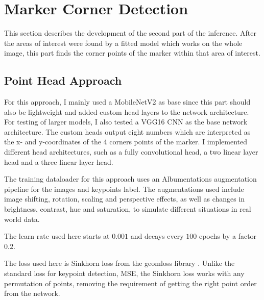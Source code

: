 \documentclass[10pt]{book}
\newcommand{\figureref}[1]{\autoref{#1}}
\begin{document}
\section{Marker Corner Detection}

This section describes the development of the second part of the inference. After the areas of interest were found by a fitted model which works on the whole image, this part finds the corner points of the marker within that area of interest.

\subsection{Point Head Approach}

For this approach, I mainly used a MobileNetV2 as base since this part should also be lightweight and added custom head layers to the network architecture. For testing of larger models, I also tested a VGG16 \ac{CNN} as the base network architecture. The custom heads output eight numbers which are interpreted as the x- and y-coordinates of the 4 corners points of the marker. I implemented different head architectures, such as a fully convolutional head, a two linear layer head and a three linear layer head.

The training dataloader for this approach uses an Albumentations augmentation pipeline for the images and keypoints label. The augmentations used include image shifting, rotation, scaling and perspective effects, as well as changes in brightness, contrast, hue and saturation, to simulate different situations in real world data.

The learn rate used here starts at $0.001$ and decays every $100$ epochs by a factor $0.2$. 


The loss used here is Sinkhorn loss from the geomloss library \cite{feydy2019interpolating}. Unlike the standard loss for keypoint detection, \ac{MSE}, the Sinkhorn loss works with any permutation of points, removing the requirement of getting the right point order from the network. 
\end{document}
